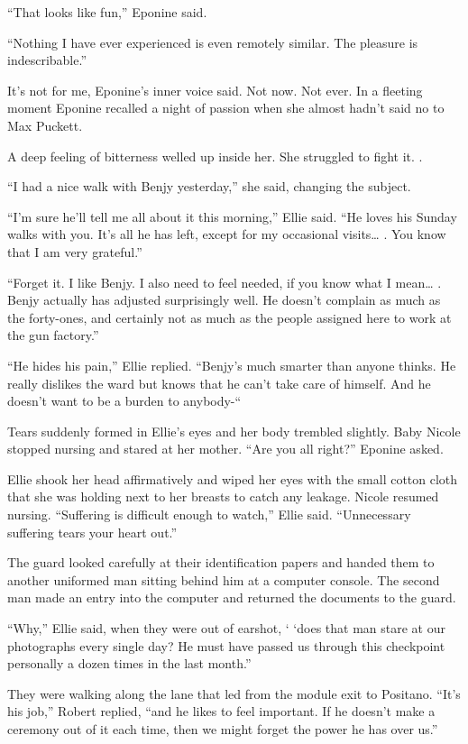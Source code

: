 \documentclass[]{article}
\begin{document}
{{“That looks like fun,” Eponine said.

“Nothing I have ever experienced is even remotely similar.  The pleasure is indescribable.”

It’s not for me, Eponine’s inner voice said.  Not now.  Not ever.  In a fleeting moment Eponine recalled a night of passion when she almost hadn’t said no to Max Puckett.

A deep feeling of bitterness welled up inside her.  She struggled to fight it.  .

“I had a nice walk with Benjy yesterday,” she said, changing the subject.

“I’m sure he’ll tell me all about it this morning,” Ellie said.  “He loves his Sunday walks with you.  It’s all he has left, except for my occasional visits… .  You know that I am very grateful.”

“Forget it.  I like Benjy.  I also need to feel needed, if you know what I mean… .  Benjy actually has adjusted surprisingly well.  He doesn’t complain as much as the forty-ones, and certainly not as much as the people assigned here to work at the gun factory.”

“He hides his pain,” Ellie replied.  “Benjy’s much smarter than anyone thinks.  He really dislikes the ward but knows that he can’t take care of himself.  And he doesn’t want to be a burden to anybody-“

Tears suddenly formed in Ellie’s eyes and her body trembled slightly.  Baby Nicole stopped nursing and stared at her mother.  “Are you all right?” Eponine asked.

Ellie shook her head affirmatively and wiped her eyes with the small cotton cloth that she was holding next to her breasts to catch any leakage.  Nicole resumed nursing.  “Suffering is difficult enough to watch,” Ellie said.  “Unnecessary suffering tears your heart out.”

The guard looked carefully at their identification papers and handed them to another uniformed man sitting behind him at a computer console.  The second man made an entry into the computer and returned the documents to the guard.

“Why,” Ellie said, when they were out of earshot, ‘ ‘does that man stare at our photographs every single day? He must have passed us through this checkpoint personally a dozen times in the last month.”

They were walking along the lane that led from the module exit to Positano.  “It’s his job,” Robert replied, “and he likes to feel important.  If he doesn’t make a ceremony out of it each time, then we might forget the power he has over us.”

}}
\end{document}
